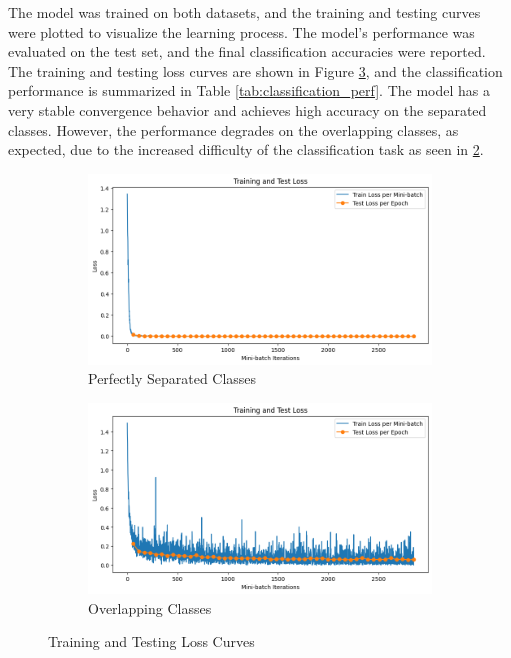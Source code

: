 \documentclass{article}
\begin{document}
The model was trained on both datasets, and the training and testing curves were plotted to visualize the learning process. The model's performance was evaluated on the test set, and the final classification accuracies were reported. The training and testing loss curves are shown in Figure \ref{fig:train_test_loss}, and the classification performance is summarized in Table \ref{tab:classification_perf}. The model has a very stable convergence behavior and achieves high accuracy on the separated classes. However, the performance degrades on the overlapping classes, as expected, due to the increased difficulty of the classification task as seen in \ref{fig:train_dist_ovlp}.

\begin{figure}[ht]
  \centering
  \begin{subfigure}{0.45\textwidth}
    \includegraphics[width=\textwidth]{images/q1_train_dist_sep.png}
    \caption{Perfectly Separated Classes}
    \label{fig:train_dist_sep}
  \end{subfigure}
  \hspace{0.5cm}
  \begin{subfigure}{0.45\textwidth}
    \includegraphics[width=\textwidth]{images/q1_train_dist_ovlp.png}
    \caption{Overlapping Classes}
    \label{fig:train_dist_ovlp}
  \end{subfigure}
  \caption{Training and Testing Loss Curves}
  \label{fig:train_test_loss}
\end{figure}
\end{document}
